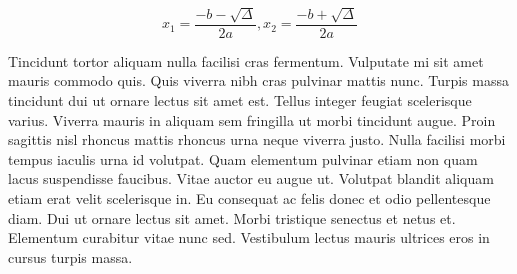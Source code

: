\documentclass{article}
\begin{document}
    \begin{equation}
    	x_1=\frac{-b-\sqrt{\Delta}}{2a},x_2=\frac{-b+\sqrt{\Delta}}{2a}
    \end{equation}
    
    Tincidunt tortor aliquam nulla facilisi cras fermentum. Vulputate mi sit amet mauris commodo quis. Quis viverra nibh cras pulvinar mattis nunc. Turpis massa tincidunt dui ut ornare lectus sit amet est. Tellus integer feugiat scelerisque varius. Viverra mauris in aliquam sem fringilla ut morbi tincidunt augue. Proin sagittis nisl rhoncus mattis rhoncus urna neque viverra justo. Nulla facilisi morbi tempus iaculis urna id volutpat. Quam elementum pulvinar etiam non quam lacus suspendisse faucibus. Vitae auctor eu augue ut. Volutpat blandit aliquam etiam erat velit scelerisque in. Eu consequat ac felis donec et odio pellentesque diam. Dui ut ornare lectus sit amet. Morbi tristique senectus et netus et. Elementum curabitur vitae nunc sed. Vestibulum lectus mauris ultrices eros in cursus turpis massa.
    
\end{document}
